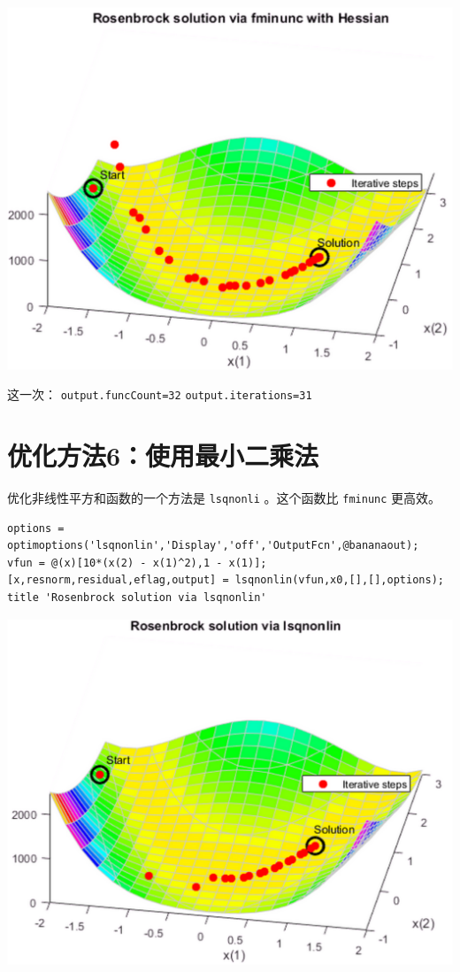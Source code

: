 \documentclass[10pt,a4paper,UTF8]{article}
\begin{document}
\begin{center}
\includegraphics[width=.9\linewidth]{../../img/communication_matlab/20171014rosenbrockfminunc4.png}
\end{center}

这一次： \texttt{output.funcCount=32} \texttt{output.iterations=31}
\section{优化方法6：使用最小二乘法}
\label{sec:orgdc6f6f0}


优化非线性平方和函数的一个方法是 \texttt{lsqnonli} 。这个函数比 \texttt{fminunc} 更高效。

\lstset{language=matlab,label= ,caption= ,captionpos=b,numbers=none}
\begin{lstlisting}
options = optimoptions('lsqnonlin','Display','off','OutputFcn',@bananaout);
vfun = @(x)[10*(x(2) - x(1)^2),1 - x(1)];
[x,resnorm,residual,eflag,output] = lsqnonlin(vfun,x0,[],[],options);
title 'Rosenbrock solution via lsqnonlin'
\end{lstlisting}

\begin{center}
\includegraphics[width=.9\linewidth]{../../img/communication_matlab/20171014rosenbrockfminunc5.png}
\end{center}
\end{document}
